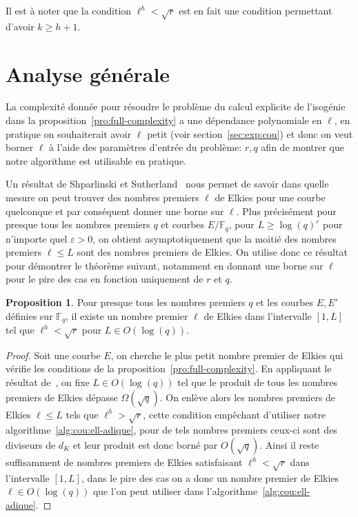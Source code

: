 \documentclass[10pt,a4paper]{book}
\theoremstyle{plain}
\theoremstyle{definition}
\theoremstyle{definition}
\theoremstyle{definition}
\newtheorem{prop}[thm]{Proposition}
\theoremstyle{definition}
\theoremstyle{remark}
\theoremstyle{remark}
\theoremstyle{definition}
\begin{document}
  Il est à noter que la condition $\ell^h<\sqrt{r}$ est en fait une condition 
  permettant d'avoir $k \geqslant h+1$.

\section{Analyse générale}
La complexité donnée pour résoudre le problème du calcul explicite de 
l'isogénie dans la proposition~\ref{pro:full-complexity} a une dépendance 
polynomiale en $\ell$, en pratique on souhaiterait avoir $\ell$ petit 
(voir section~\ref{sec:exp:cou})
et donc on veut borner $\ell$ à l'aide des paramètres d'entrée du problème: $r,q$
afin de montrer que notre algorithme est utilisable en pratique. 

Un résultat de Shparlinski et 
Sutherland~\cite[Theorem~1]{ShparlinskiSutherland14}
nous permet de savoir dans quelle mesure on peut trouver des nombres premiers 
$\ell$ de Elkies pour une courbe quelconque et par conséquent donner une borne sur
 $\ell$. Plus précisément pour presque 
tous les nombres premiers $q$ et courbes $E/\mathbb{F}_q$, pour 
$L\geqslant\log(q)^\varepsilon$ pour n'importe quel $\varepsilon>0$,
on obtient asymptotiquement que la moitié des nombres premiers $\ell \leqslant 
L$ sont des nombres premiers de Elkies.
On utilise donc ce résultat pour démontrer le théorème suivant, notamment en donnant une 
borne sur $\ell$ pour le pire des cas en fonction uniquement de $r$ et $q$.

\begin{prop}
\label{pro:bor:ell}
Pour presque tous les nombres premiers $q$ et les courbes $E,E'$ définies sur 
$\mathbb{F}_q$, il existe un nombre premier $\ell$ de Elkies 
dans l'intervalle $[1,L]$ tel que $\ell^h < \sqrt{r}$ pour $L \in O(\log(q))$.
\end{prop}

\begin{proof}
Soit une courbe $E$, on cherche le plus petit nombre premier de Elkies qui 
  vérifie les conditions de la proposition~\ref{pro:full-complexity}.
  En appliquant le résultat de~\cite[Theorem~1]{ShparlinskiSutherland14},
  on fixe $L \in O(\log(q))$ tel que le produit de tous les nombres premiers 
  de Elkies dépasse $\Omega(\sqrt{q})$. On enlève alors les nombres premiers 
  de Elkies $\ell \leqslant L$ tels que $\ell^{h} > \sqrt{r}$, cette condition
  empêchant d'utiliser notre algorithme~\ref{alg:cou:ell-adique}, 
  pour de tels nombres premiers ceux-ci sont des diviseurs de $d_{K}$ et leur 
  produit est donc borné par $O(\sqrt{q})$. Ainsi il reste suffisamment de 
  nombres premiers de Elkies satisfaisant $\ell^{h} < \sqrt{r}$ dans 
  l'intervalle  $[1,L]$, dans le pire des cas on a donc un nombre premier de
  Elkies $\ell \in O(\log(q))$ que l'on peut utiliser dans 
  l'algorithme~\ref{alg:cou:ell-adique}.
\end{proof}
\end{document}
